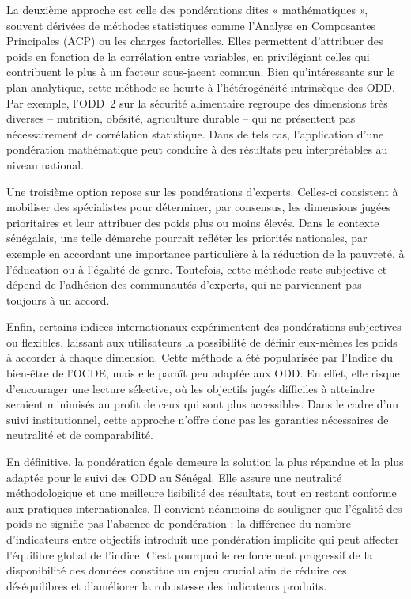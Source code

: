 La deuxième approche est celle des pondérations dites « mathématiques », souvent dérivées de méthodes statistiques comme l’Analyse en Composantes Principales (ACP) ou les charges factorielles. Elles permettent d’attribuer des poids en fonction de la corrélation entre variables, en privilégiant celles qui contribuent le plus à un facteur sous-jacent commun. Bien qu’intéressante sur le plan analytique, cette méthode se heurte à l’hétérogénéité intrinsèque des ODD. Par exemple, l’ODD~2 sur la sécurité alimentaire regroupe des dimensions très diverses – nutrition, obésité, agriculture durable – qui ne présentent pas nécessairement de corrélation statistique. Dans de tels cas, l’application d’une pondération mathématique peut conduire à des résultats peu interprétables au niveau national.

Une troisième option repose sur les pondérations d’experts. Celles-ci consistent à mobiliser des spécialistes pour déterminer, par consensus, les dimensions jugées prioritaires et leur attribuer des poids plus ou moins élevés. Dans le contexte sénégalais, une telle démarche pourrait refléter les priorités nationales, par exemple en accordant une importance particulière à la réduction de la pauvreté, à l’éducation ou à l’égalité de genre. Toutefois, cette méthode reste subjective et dépend de l’adhésion des communautés d’experts, qui ne parviennent pas toujours à un accord.

Enfin, certains indices internationaux expérimentent des pondérations subjectives ou flexibles, laissant aux utilisateurs la possibilité de définir eux-mêmes les poids à accorder à chaque dimension. Cette méthode a été popularisée par l’Indice du bien-être de l’OCDE, mais elle paraît peu adaptée aux ODD. En effet, elle risque d’encourager une lecture sélective, où les objectifs jugés difficiles à atteindre seraient minimisés au profit de ceux qui sont plus accessibles. Dans le cadre d’un suivi institutionnel, cette approche n’offre donc pas les garanties nécessaires de neutralité et de comparabilité.

En définitive, la pondération égale demeure la solution la plus répandue et la plus adaptée pour le suivi des ODD au Sénégal. Elle assure une neutralité méthodologique et une meilleure lisibilité des résultats, tout en restant conforme aux pratiques internationales. Il convient néanmoins de souligner que l’égalité des poids ne signifie pas l’absence de pondération : la différence du nombre d’indicateurs entre objectifs introduit une pondération implicite qui peut affecter l’équilibre global de l’indice. C’est pourquoi le renforcement progressif de la disponibilité des données constitue un enjeu crucial afin de réduire ces déséquilibres et d’améliorer la robustesse des indicateurs produits.




















